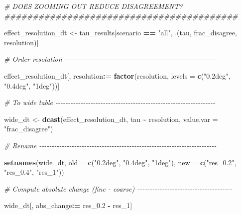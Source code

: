 \documentclass[
  11pt,
]{article}
\newenvironment{Shaded}{\begin{snugshade}}{\end{snugshade}}
\newcommand{\AttributeTok}[1]{\textcolor[rgb]{0.13,0.29,0.53}{#1}}
\newcommand{\CommentTok}[1]{\textcolor[rgb]{0.56,0.35,0.01}{\textit{#1}}}
\newcommand{\FloatTok}[1]{\textcolor[rgb]{0.00,0.00,0.81}{#1}}
\newcommand{\FunctionTok}[1]{\textcolor[rgb]{0.13,0.29,0.53}{\textbf{#1}}}
\newcommand{\NormalTok}[1]{#1}
\newcommand{\OtherTok}[1]{\textcolor[rgb]{0.56,0.35,0.01}{#1}}
\newcommand{\SpecialCharTok}[1]{\textcolor[rgb]{0.81,0.36,0.00}{\textbf{#1}}}
\newcommand{\StringTok}[1]{\textcolor[rgb]{0.31,0.60,0.02}{#1}}
\begin{document}
\begin{Shaded}
\begin{Highlighting}[]
\CommentTok{\# DOES ZOOMING OUT REDUCE DISAGREEMENT? \#\#\#\#\#\#\#\#\#\#\#\#\#\#\#\#\#\#\#\#\#\#\#\#\#\#\#\#\#\#\#\#\#\#\#\#\#\#\#\#\#}

\NormalTok{effect\_resolution\_dt }\OtherTok{\textless{}{-}}\NormalTok{ tau\_results[scenario }\SpecialCharTok{==} \StringTok{"all"}\NormalTok{, .(tau, frac\_disagree, resolution)]}

\CommentTok{\# Order resolution {-}{-}{-}{-}{-}{-}{-}{-}{-}{-}{-}{-}{-}{-}{-}{-}{-}{-}{-}{-}{-}{-}{-}{-}{-}{-}{-}{-}{-}{-}{-}{-}{-}{-}{-}{-}{-}{-}{-}{-}{-}{-}{-}{-}{-}{-}{-}{-}{-}{-}{-}{-}{-}{-}{-}{-}{-}{-}{-}{-}{-}}

\NormalTok{effect\_resolution\_dt[, resolution}\SpecialCharTok{:=} \FunctionTok{factor}\NormalTok{(resolution,}
                                           \AttributeTok{levels =} \FunctionTok{c}\NormalTok{(}\StringTok{"0.2deg"}\NormalTok{, }\StringTok{"0.4deg"}\NormalTok{, }\StringTok{"1deg"}\NormalTok{))]}

\CommentTok{\# To wide table {-}{-}{-}{-}{-}{-}{-}{-}{-}{-}{-}{-}{-}{-}{-}{-}{-}{-}{-}{-}{-}{-}{-}{-}{-}{-}{-}{-}{-}{-}{-}{-}{-}{-}{-}{-}{-}{-}{-}{-}{-}{-}{-}{-}{-}{-}{-}{-}{-}{-}{-}{-}{-}{-}{-}{-}{-}{-}{-}{-}{-}{-}{-}{-}}

\NormalTok{wide\_dt }\OtherTok{\textless{}{-}} \FunctionTok{dcast}\NormalTok{(effect\_resolution\_dt, tau }\SpecialCharTok{\textasciitilde{}}\NormalTok{ resolution, }\AttributeTok{value.var =} \StringTok{"frac\_disagree"}\NormalTok{)}

\CommentTok{\# Rename {-}{-}{-}{-}{-}{-}{-}{-}{-}{-}{-}{-}{-}{-}{-}{-}{-}{-}{-}{-}{-}{-}{-}{-}{-}{-}{-}{-}{-}{-}{-}{-}{-}{-}{-}{-}{-}{-}{-}{-}{-}{-}{-}{-}{-}{-}{-}{-}{-}{-}{-}{-}{-}{-}{-}{-}{-}{-}{-}{-}{-}{-}{-}{-}{-}{-}{-}{-}{-}{-}{-}}

\FunctionTok{setnames}\NormalTok{(wide\_dt, }\AttributeTok{old =} \FunctionTok{c}\NormalTok{(}\StringTok{"0.2deg"}\NormalTok{, }\StringTok{"0.4deg"}\NormalTok{, }\StringTok{"1deg"}\NormalTok{), }\AttributeTok{new =} \FunctionTok{c}\NormalTok{(}\StringTok{"res\_0.2"}\NormalTok{, }\StringTok{"res\_0.4"}\NormalTok{, }\StringTok{"res\_1"}\NormalTok{))}

\CommentTok{\# Compute absolute change (fine {-} coarse) {-}{-}{-}{-}{-}{-}{-}{-}{-}{-}{-}{-}{-}{-}{-}{-}{-}{-}{-}{-}{-}{-}{-}{-}{-}{-}{-}{-}{-}{-}{-}{-}{-}{-}{-}{-}{-}{-}}

\NormalTok{wide\_dt[, abs\_change}\SpecialCharTok{:=}\NormalTok{ res\_0}\FloatTok{.2} \SpecialCharTok{{-}}\NormalTok{ res\_1]}


\end{Highlighting}
\end{Shaded}
\end{document}
